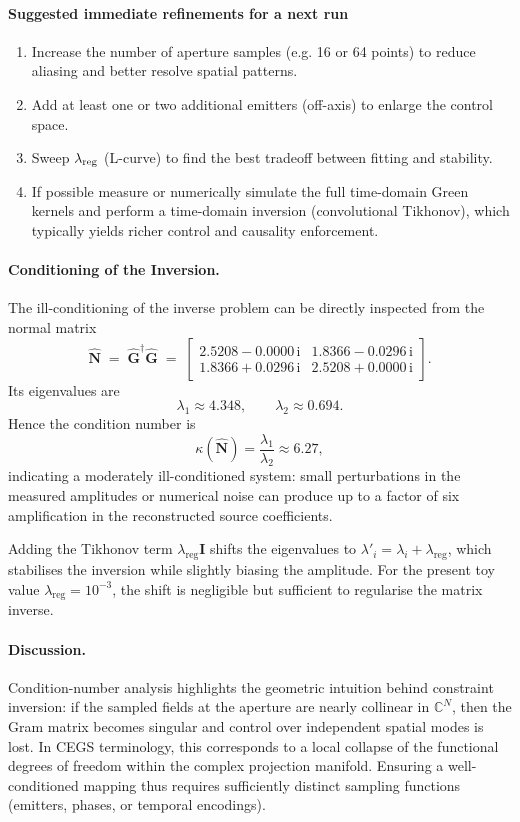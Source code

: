 \documentclass[11pt]{article}
\theoremstyle{plain}
\theoremstyle{definition}
\theoremstyle{remark}
\begin{document}
\paragraph{Suggested immediate refinements for a next run}
\begin{enumerate}[leftmargin=*,itemsep=4pt]
  \item Increase the number of aperture samples (e.g. 16 or 64 points) to reduce aliasing and better resolve spatial patterns.
  \item Add at least one or two additional emitters (off-axis) to enlarge the control space.
  \item Sweep \(\lambda_{\rm reg}\) (L-curve) to find the best tradeoff between fitting and stability.
  \item If possible measure or numerically simulate the full time-domain Green kernels and perform a time-domain inversion (convolutional Tikhonov), which typically yields richer control and causality enforcement.
\end{enumerate}

\paragraph{Conditioning of the Inversion.}
The ill-conditioning of the inverse problem can be directly inspected
from the normal matrix
\[
\hat{\mathbf{N}} \;=\; \hat{\mathbf{G}}^\dagger \hat{\mathbf{G}}
\;=\;
\begin{bmatrix}
2.5208 - 0.0000\,\mathrm{i} & 1.8366 - 0.0296\,\mathrm{i} \\[4pt]
1.8366 + 0.0296\,\mathrm{i} & 2.5208 + 0.0000\,\mathrm{i}
\end{bmatrix}.
\]
Its eigenvalues are
\[
\lambda_1 \approx 4.348, \qquad
\lambda_2 \approx 0.694.
\]
Hence the condition number is
\[
\kappa(\hat{\mathbf{N}}) = \frac{\lambda_1}{\lambda_2} \approx 6.27,
\]
indicating a moderately ill-conditioned system: small perturbations in
the measured amplitudes or numerical noise can produce up to a factor of
six amplification in the reconstructed source coefficients.

Adding the Tikhonov term \(\lambda_{\mathrm{reg}}\mathbf{I}\)
shifts the eigenvalues to
\(\lambda'_i = \lambda_i + \lambda_{\mathrm{reg}}\),
which stabilises the inversion while slightly biasing the amplitude.
For the present toy value
\(\lambda_{\mathrm{reg}} = 10^{-3}\),
the shift is negligible but sufficient to regularise the matrix inverse.

\paragraph{Discussion.}
Condition-number analysis highlights the geometric intuition behind
constraint inversion:
if the sampled fields at the aperture are nearly collinear in
\(\mathbb{C}^N\), then the Gram matrix becomes singular and control
over independent spatial modes is lost.
In CEGS terminology, this corresponds to a local collapse of the
functional degrees of freedom within the complex projection manifold.
Ensuring a well-conditioned mapping thus requires sufficiently distinct
sampling functions (emitters, phases, or temporal encodings).
\end{document}
